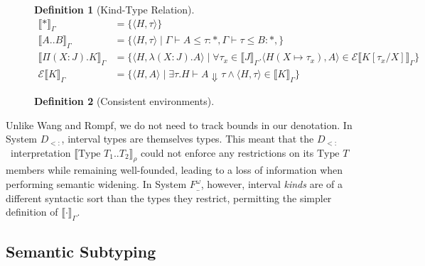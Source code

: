 \documentclass[a4paper, 10pt]{article}
\newcommand{\Fwint}{\ensuremath{F^\omega_{..}}}
\newcommand{\Dsub}{\ensuremath{D_{<:}}}
\newcommand{\interval}[2]{#1 .. #2}
\newcommand{\TyKd}{*}
\newcommand{\KDepArr}[3]{\Pi(#1:#2).#3}
\newcommand{\subst}[3]{#1[#2/#3]}
\newcommand{\isenv}[1]{#1\ \texttt{env}}
\newcommand{\stepsn}[1][]{\Downarrow^{#1}}
\newcommand{\KDenot}[2][\Gamma]{\llbracket #2 \rrbracket_{#1}}
\newcommand{\KEval}[2][\Gamma]{\mathscr{E}\llbracket #2 \rrbracket_{#1}}
\newtheorem{defn}{Definition}
\begin{document}
\begin{figure}[ht]
  \begin{defn}[Kind-Type Relation]
    \begin{align*}
      \KDenot{\TyKd} &= \{ \langle H, \tau \rangle \} \\
      \KDenot{\interval{A}{B}} &=
        \{ \langle H, \tau \rangle \mid
           \Gamma \vdash A \le \tau : \TyKd,
           \Gamma \vdash \tau \le B : \TyKd,
        \} \\
      \KDenot{\KDepArr{X}{J}{K}} &=
        \{ \langle H, \lambda(X:J).A \rangle \mid
           \forall \tau_x \in \KDenot{J} .
             \langle H(X \mapsto \tau_x), A \rangle \in
             \KEval[\Gamma]{\subst{K}{\tau_x}{X}}
        \} \\
      \KEval{K} &=
        \{ \langle H, A \rangle \mid
           \exists \tau .
             H \vdash A \stepsn \tau \land
             \langle H, \tau \rangle \in \KDenot{K}
        \}
    \end{align*}
  \end{defn}
\end{figure}

\begin{figure}[ht]
  \begin{defn}[Consistent environments]
  \end{defn}
\end{figure}

Unlike Wang and Rompf, we do not need to track bounds in our denotation. In
System \Dsub, interval types are themselves types. This meant that the
\Dsub\ interpretation $\KDenot[\rho]{\text{Type }T_1..T_2}$ could not enforce
any restrictions on its $\text{Type }T$ members while remaining well-founded,
leading to a loss of information when performing semantic widening. In System
\Fwint, however, interval \emph{kinds} are of a different syntactic sort than
the types they restrict, permitting the simpler definition of $\KDenot{\cdot}$.

\subsection{Semantic Subtyping}
\end{document}
